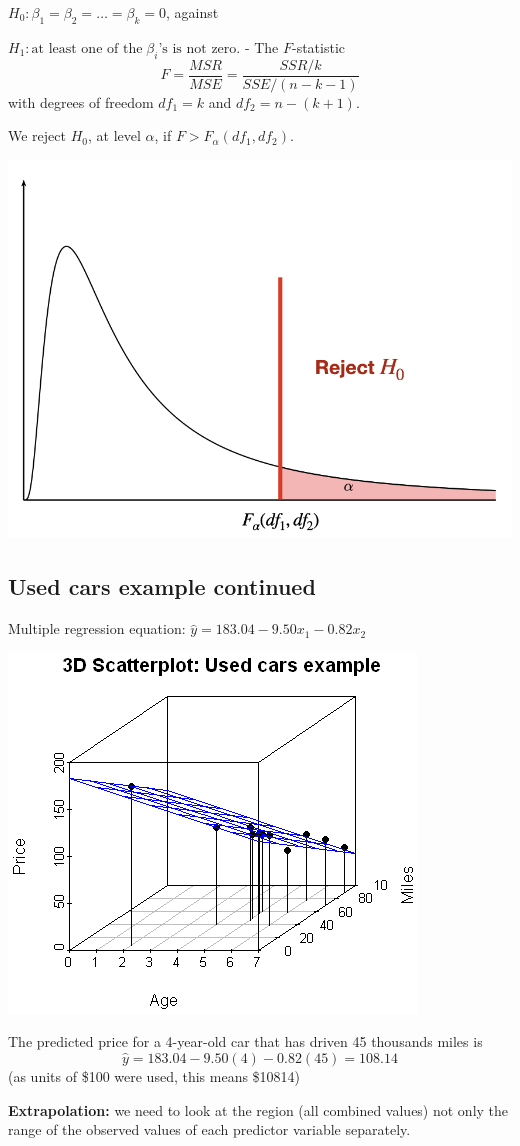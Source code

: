 \documentclass[
]{article}
\begin{document}
\(H_0: \beta_1=\beta_2=\ldots =\beta_k=0\), against

\(H_1: \text{at least one of the} \;\beta_i \text{'s is not zero}\). -
The \(F\)-statistic \[F=\frac{MSR}{MSE}=\frac{SSR/k}{SSE/(n-k-1)}\] with
degrees of freedom \(df_1=k\) and \(df_2=n-(k+1)\).

We reject \(H_0\), at level \(\alpha\), if \(F>F_{\alpha}(df_1,df_2)\).

\begin{center}\includegraphics[width=0.4\linewidth,height=0.4\textheight]{figures/Ftest} \end{center}

\hypertarget{used-cars-example-continued}{%
\subsection{Used cars example
continued}\label{used-cars-example-continued}}

Multiple regression equation: \(\hat{y}=183.04-9.50 x_1- 0.82 x_2\)

\begin{center}\includegraphics[width=0.4\linewidth,height=0.4\textheight]{figures/3d2} \end{center}

The predicted price for a 4-year-old car that has driven 45 thousands
miles is \[\hat{y}=183.04-9.50 (4)- 0.82 (45)=108.14\] (as units of
\$100 were used, this means \$10814)

\textbf{Extrapolation:} we need to look at the region (all combined
values) not only the range of the observed values of each predictor
variable separately.
\end{document}
